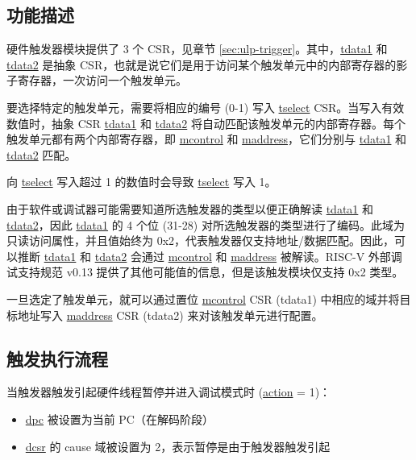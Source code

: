 \documentclass[main\_\_CN.tex]{subfiles}
\begin{document}
\subsection{功能描述}
\label{sec:ulp-hwt-func-descr}

硬件触发器模块提供了 3 个 CSR，见章节 \ref{sec:ulp-trigger}。其中，\hyperref[regdesc:LPTDATA1]{tdata1} 和 \hyperref[regdesc:LPTDATA2]{tdata2} 是抽象 CSR，也就是说它们是用于访问某个触发单元中的内部寄存器的影子寄存器，一次访问一个触发单元。

要选择特定的触发单元，需要将相应的编号 (0-1) 写入 \hyperref[regdesc:LPTSELECT]{tselect} CSR。当写入有效数值时，抽象 CSR \hyperref[regdesc:LPTDATA1]{tdata1} 和 \hyperref[regdesc:LPTDATA2]{tdata2} 将自动匹配该触发单元的内部寄存器。每个触发单元都有两个内部寄存器，即 \hyperref[regdesc:LPMCONTROL]{mcontrol} 和 \hyperref[regdesc:LPMADDRESS]{maddress}，它们分别与 \hyperref[regdesc:LPTDATA1]{tdata1} 和 \hyperref[regdesc:LPTDATA2]{tdata2} 匹配。

向 \hyperref[regdesc:LPTSELECT]{tselect} 写入超过 1 的数值时会导致 \hyperref[regdesc:LPTSELECT]{tselect} 写入 1。

由于软件或调试器可能需要知道所选触发器的类型以便正确解读 \hyperref[regdesc:LPTDATA1]{tdata1} 和 \hyperref[regdesc:LPTDATA2]{tdata2}，因此 \hyperref[regdesc:LPTDATA1]{tdata1} 的 4 个位 (31-28) 对所选触发器的类型进行了编码。此域为只读访问属性，并且值始终为 0x2，代表触发器仅支持地址/数据匹配。因此，可以推断 \hyperref[regdesc:LPTDATA1]{tdata1} 和 \hyperref[regdesc:LPTDATA2]{tdata2} 会通过 \hyperref[regdesc:LPMCONTROL]{mcontrol} 和 \hyperref[regdesc:LPMADDRESS]{maddress} 被解读。RISC-V 外部调试支持规范 v0.13 提供了其他可能值的信息，但是该触发模块仅支持 0x2 类型。

一旦选定了触发单元，就可以通过置位  \hyperref[regdesc:LPMCONTROL]{mcontrol} CSR (tdata1) 中相应的域并将目标地址写入 \hyperref[regdesc:LPMADDRESS]{maddress} CSR (tdata2) 来对该触发单元进行配置。


\subsection{触发执行流程}
\label{sec:ulp-hwt-suggest-op}

当触发器触发引起硬件线程暂停并进入调试模式时 (\hyperref[fielddesc:LPMCONTROLACTION]{action} = 1)：
\begin{itemize}
    \item \hyperref[regdesc:LPDPC]{dpc} 被设置为当前 PC（在解码阶段）
    \item \hyperref[regdesc:LPDCSR]{dcsr} 的 cause 域被设置为 2，表示暂停是由于触发器触发引起
\end{itemize}
\end{document}
